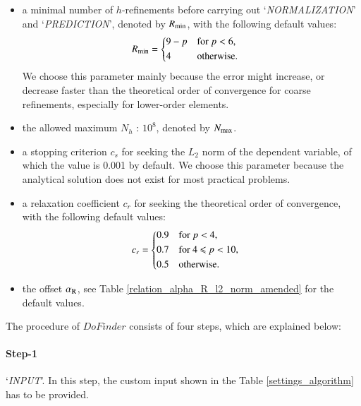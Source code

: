 \documentclass[review,3p]{elsarticle}
\begin{document}
\begin{itemize}
  \renewcommand\labelitemi{--}
  \item a minimal number of $h$-refinements before carrying out `\textit{NORMALIZATION}' and `\textit{PREDICTION}', denoted by $R_{\rm min}$, with the following default values:
  \begin{equation}
  \begin{aligned}
      R_{\rm min} &=
      \begin{cases*}
	9-p & for $p < 6$, \\
	4 & otherwise.
      \end{cases*}
  \end{aligned}
  \end{equation} 
  We choose this parameter mainly because the error might increase, or decrease faster than the theoretical order of convergence for coarse refinements, especially for lower-order elements.
  \item the allowed maximum $N_h$ : $10^8$, denoted by $N_{\rm max}$.  
  \item a stopping criterion $c_s$ for seeking the $L_2$ norm of the dependent variable, of which the value is 0.001 by default. We choose this parameter because the analytical solution does not exist for most practical problems.
  \item a relaxation coefficient $c_r$ for seeking the theoretical order of convergence, with the following default values: 
    \begin{equation}
    \begin{aligned}
	c_r &=
	\begin{cases*}
	  0.9 & for $p<4$, \\
	  0.7 & for 4 $\leqslant$ $p < 10$, \\
	  0.5 & otherwise.
	\end{cases*}
    \end{aligned}
    \end{equation}
  \item the offset $\alpha _{\rm R}$, see Table \ref{relation_alpha_R_l2_norm_amended} for the default values.
\end{itemize}

The procedure of $DoFinder$ consists of four steps, which are explained below:

\paragraph{Step-1} `\textit{INPUT}'. In this step, the custom input shown in the Table \ref{settings_algorithm} has to be provided.
\end{document}

